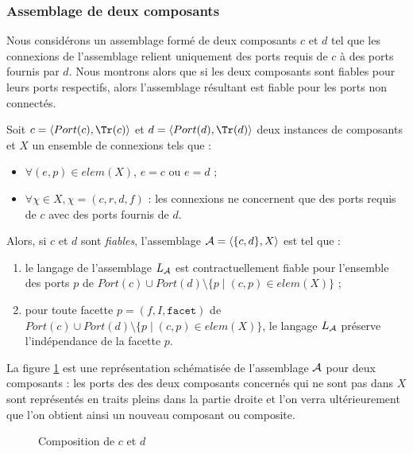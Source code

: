 \subsubsection{Assemblage de deux composants}

Nous consid\'erons un assemblage form\'e de deux composants $c$ et
$d$ tel que les connexions de l'assemblage relient uniquement des
ports requis de $c$ \`a des ports fournis par $d$. Nous montrons
alors que si les deux composants sont fiables pour leurs ports
respectifs, alors l'assemblage r\'esultant est fiable pour les ports
non connect\'es. 

\begin{lemma}
\label{lem:assemblage-de-deux}
    Soit $c=\langle Port(c), \Tr(c) \rangle $ et $d=\langle Port(d),
    \Tr(d) \rangle $ deux instances de composants et $X$ un ensemble
    de connexions tels que :
    \begin{itemize}
      \item $\forall (e,p)\in elem(X)$, $e=c$ ou $e =d$ ;
      \item $\forall \chi \in X, \chi=(c,r,d,f)$ : les connexions
      ne concernent que des ports requis de $c$ avec des ports fournis
      de $d$.
    \end{itemize}
    Alors, si $c$ et $d$ sont \emph{fiables}, l'assemblage ${\cal A} = \langle
    \{c,d\},X\rangle$  est tel que : 
    \begin{enumerate}
      \item le langage de l'assemblage $L_{\cal A}$ est
        contractuellement fiable pour l'ensemble des ports $p$ de $Port(c)\cup Port(d) \setminus \{ p \mid (c,p) \in elem(X)\}$ ;
      \item pour toute facette $p=(f,I,\mathtt{facet})$ de $Port(c)\cup
        Port(d) \setminus \{ p \mid (c,p) \in elem(X)\}$, le langage
        $L_{\cal A}$ pr\'eserve l'ind\'ependance de la facette $p$.
    \end{enumerate}
\end{lemma}

La figure \ref{fig-compo-proof} est une repr\'esentation
sch\'ematis\'ee de l'assemblage $\cal A$ pour deux composants : les ports  des
des deux composants concern\'es qui ne sont pas  dans $X$ sont
repr\'esent\'es en traits pleins dans la partie droite et l'on verra
ult\'erieurement que l'on obtient ainsi un nouveau composant ou
composite. 

\begin{figure}[htbp]
    \centering
    \caption{Composition de $c$ et $d$}
    \label{fig-compo-proof}
\end{figure}

